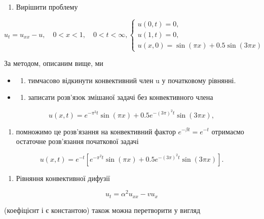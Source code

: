 \documentclass[
  ukrainian,
]{article}
\providecommand{\tightlist}{%
  \setlength{\itemsep}{0pt}\setlength{\parskip}{0pt}}
\begin{document}
\begin{enumerate}
\def\labelenumi{\arabic{enumi}.}
\tightlist
\item
  Вирішити проблему
\end{enumerate}

\[
u_t = u_{xx} - u, \quad 0 < x < 1, \quad 0 < t < \infty,
\begin{cases} u(0, t) = 0, \\ u(1, t) = 0, \\ u(x, 0) = \sin(\pi x) + 0.5\sin(3\pi x) \end{cases}
\]

За методом, описаним вище, ми

\begin{itemize}
\tightlist
\item
  \begin{enumerate}
  \def\labelenumi{\alph{enumi})}
  \tightlist
  \item
    тимчасово відкинути конвективний член u у початковому рівнянні.
  \end{enumerate}
\item
  \begin{enumerate}
  \def\labelenumi{\alph{enumi})}
  \setcounter{enumi}{1}
  \tightlist
  \item
    записати розв'язок змішаної задачі без конвективного члена
  \end{enumerate}
\end{itemize}

\[
u(x, t) = e^{-\pi^2 t} \sin(\pi x) + 0.5e^{-(3\pi)^2 t} \sin(3\pi x),
\]

\begin{enumerate}
\def\labelenumi{\alph{enumi})}
\setcounter{enumi}{2}
\tightlist
\item
  помножимо це розв'язання на конвективний фактор
  \(e^{-\beta t}=e^{-t}\) отримаємо остаточне розв'язання початкової
  задачі
\end{enumerate}

\[
u(x, t) = e^{-t} \left[ e^{-\pi^2 t} \sin(\pi x) + 0.5e^{-(3\pi)^2 t} \sin(3\pi x) \right].
\]

\begin{enumerate}
\def\labelenumi{\arabic{enumi}.}
\setcounter{enumi}{1}
\tightlist
\item
  Рівняння конвективної дифузії
\end{enumerate}

\[
u_t = \alpha^2 u_{xx} - v u_x
\]

(коефіцієнт і є константою) також можна перетворити у вигляд
\end{document}
